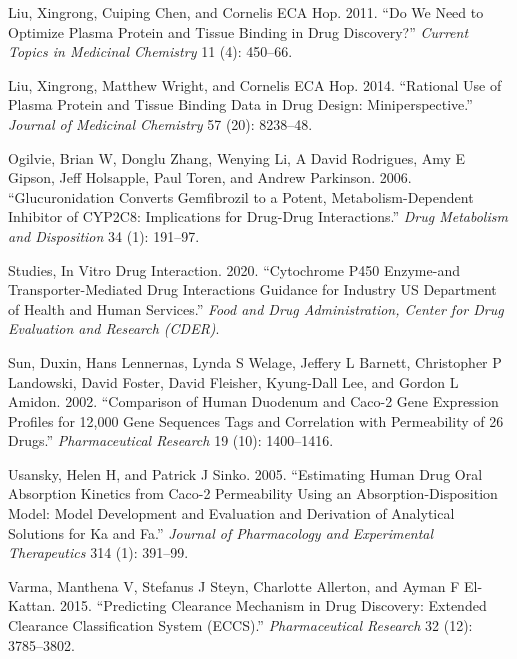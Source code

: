 \documentclass[
  11pt,
  krantz2, a4paper, twoside]{krantz}
\newlength{\cslhangindent}
\newlength{\cslentryspacingunit} %
\newenvironment{CSLReferences}[2] %
 {%
  \setlength{\parindent}{0pt}
  \ifodd #1
  \let\oldpar\par
  \def\par{\hangindent=\cslhangindent\oldpar}
  \fi
  \setlength{\parskip}{#2\cslentryspacingunit}
 }%
 {}
\begin{document}
\begin{CSLReferences}{1}{0}
\leavevmode{}%
Liu, Xingrong, Cuiping Chen, and Cornelis ECA Hop. 2011. {``Do We Need to Optimize Plasma Protein and Tissue Binding in Drug Discovery?''} \emph{Current Topics in Medicinal Chemistry} 11 (4): 450--66.

\leavevmode{}%
Liu, Xingrong, Matthew Wright, and Cornelis ECA Hop. 2014. {``Rational Use of Plasma Protein and Tissue Binding Data in Drug Design: Miniperspective.''} \emph{Journal of Medicinal Chemistry} 57 (20): 8238--48.

\leavevmode{}%
Ogilvie, Brian W, Donglu Zhang, Wenying Li, A David Rodrigues, Amy E Gipson, Jeff Holsapple, Paul Toren, and Andrew Parkinson. 2006. {``Glucuronidation Converts Gemfibrozil to a Potent, Metabolism-Dependent Inhibitor of CYP2C8: Implications for Drug-Drug Interactions.''} \emph{Drug Metabolism and Disposition} 34 (1): 191--97.

\leavevmode{}%
Studies, In Vitro Drug Interaction. 2020. {``Cytochrome P450 Enzyme-and Transporter-Mediated Drug Interactions Guidance for Industry US Department of Health and Human Services.''} \emph{Food and Drug Administration, Center for Drug Evaluation and Research (CDER)}.

\leavevmode{}%
Sun, Duxin, Hans Lennernas, Lynda S Welage, Jeffery L Barnett, Christopher P Landowski, David Foster, David Fleisher, Kyung-Dall Lee, and Gordon L Amidon. 2002. {``Comparison of Human Duodenum and Caco-2 Gene Expression Profiles for 12,000 Gene Sequences Tags and Correlation with Permeability of 26 Drugs.''} \emph{Pharmaceutical Research} 19 (10): 1400--1416.

\leavevmode{}%
Usansky, Helen H, and Patrick J Sinko. 2005. {``Estimating Human Drug Oral Absorption Kinetics from Caco-2 Permeability Using an Absorption-Disposition Model: Model Development and Evaluation and Derivation of Analytical Solutions for Ka and Fa.''} \emph{Journal of Pharmacology and Experimental Therapeutics} 314 (1): 391--99.

\leavevmode{}%
Varma, Manthena V, Stefanus J Steyn, Charlotte Allerton, and Ayman F El-Kattan. 2015. {``Predicting Clearance Mechanism in Drug Discovery: Extended Clearance Classification System (ECCS).''} \emph{Pharmaceutical Research} 32 (12): 3785--3802.


\end{CSLReferences}
\end{document}
